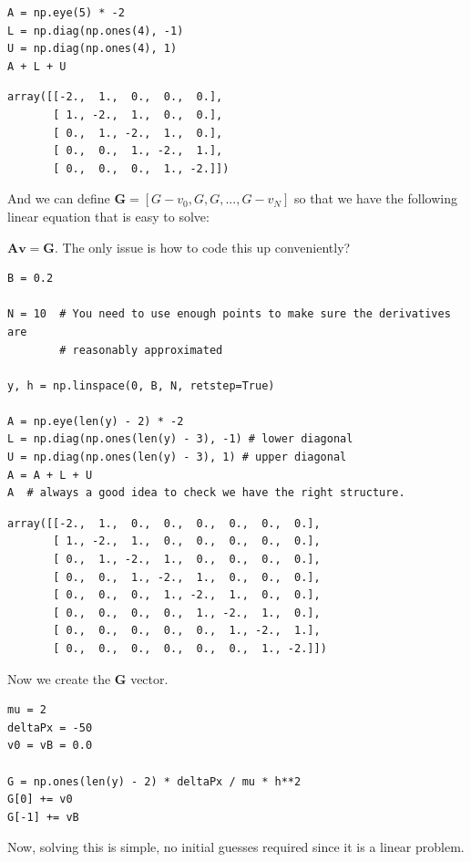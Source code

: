 \documentclass[11pt]{article}
\begin{document}
\begin{verbatim}
A = np.eye(5) * -2
L = np.diag(np.ones(4), -1)
U = np.diag(np.ones(4), 1)
A + L + U
\end{verbatim}

\begin{verbatim}
array([[-2.,  1.,  0.,  0.,  0.],
       [ 1., -2.,  1.,  0.,  0.],
       [ 0.,  1., -2.,  1.,  0.],
       [ 0.,  0.,  1., -2.,  1.],
       [ 0.,  0.,  0.,  1., -2.]])
\end{verbatim}


And we can define \(\mathbf{G} = [G - v_0, G, G, ..., G - v_N]\) so that we have the following linear equation that is easy to solve:

\(\mathbf{A} \mathbf{v} = \mathbf{G}\). The only issue is how to code this up conveniently?

\begin{verbatim}
B = 0.2

N = 10  # You need to use enough points to make sure the derivatives are
        # reasonably approximated

y, h = np.linspace(0, B, N, retstep=True)

A = np.eye(len(y) - 2) * -2
L = np.diag(np.ones(len(y) - 3), -1) # lower diagonal
U = np.diag(np.ones(len(y) - 3), 1) # upper diagonal
A = A + L + U
A  # always a good idea to check we have the right structure.
\end{verbatim}

\begin{verbatim}
array([[-2.,  1.,  0.,  0.,  0.,  0.,  0.,  0.],
       [ 1., -2.,  1.,  0.,  0.,  0.,  0.,  0.],
       [ 0.,  1., -2.,  1.,  0.,  0.,  0.,  0.],
       [ 0.,  0.,  1., -2.,  1.,  0.,  0.,  0.],
       [ 0.,  0.,  0.,  1., -2.,  1.,  0.,  0.],
       [ 0.,  0.,  0.,  0.,  1., -2.,  1.,  0.],
       [ 0.,  0.,  0.,  0.,  0.,  1., -2.,  1.],
       [ 0.,  0.,  0.,  0.,  0.,  0.,  1., -2.]])
\end{verbatim}

Now we create the \(\mathbf{G}\) vector.

\begin{verbatim}
mu = 2
deltaPx = -50
v0 = vB = 0.0

G = np.ones(len(y) - 2) * deltaPx / mu * h**2
G[0] += v0
G[-1] += vB
\end{verbatim}

Now, solving this is simple, no initial guesses required since it is a linear problem.
\end{document}
